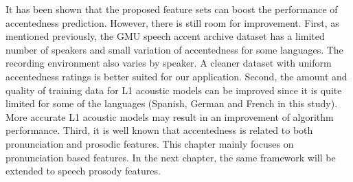 It has been shown that the proposed feature sets can boost the performance of accentedness prediction. However, there is still room for improvement. First, as mentioned previously, the GMU speech accent archive dataset has a limited number of speakers and small variation of accentedness for some languages. The recording environment also varies by speaker. A cleaner dataset with uniform accentedness ratings is better suited for our application. Second, the amount and quality of training data for L1 acoustic models can be improved since it is quite limited for some of the languages (Spanish, German and French in this study). More accurate L1 acoustic models may result in an improvement of algorithm performance. Third, it is well known that accentedness is related to both pronunciation and prosodic features. This chapter mainly focuses on pronunciation based features. In the next chapter, the same framework will be extended to speech prosody features.
